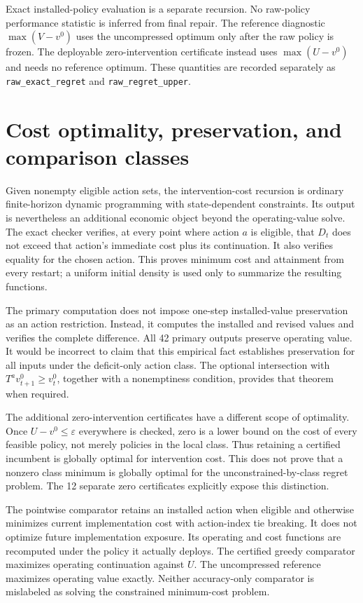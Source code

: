 Exact installed-policy evaluation is a separate recursion. No raw-policy performance statistic is inferred from final repair. The reference diagnostic $\max(V-v^0)$ uses the uncompressed optimum only after the raw policy is frozen. The deployable zero-intervention certificate instead uses $\max(U-v^0)$ and needs no reference optimum. These quantities are recorded separately as \texttt{raw\_exact\_regret} and \texttt{raw\_regret\_upper}.

\section{Cost optimality, preservation, and comparison classes}\label{app:cost}
Given nonempty eligible action sets, the intervention-cost recursion is ordinary finite-horizon dynamic programming with state-dependent constraints. Its output is nevertheless an additional economic object beyond the operating-value solve. The exact checker verifies, at every point where action $a$ is eligible, that $D_t$ does not exceed that action's immediate cost plus its continuation. It also verifies equality for the chosen action. This proves minimum cost and attainment from every restart; a uniform initial density is used only to summarize the resulting functions.

The primary computation does not impose one-step installed-value preservation as an action restriction. Instead, it computes the installed and revised values and verifies the complete difference. All 42 primary outputs preserve operating value. It would be incorrect to claim that this empirical fact establishes preservation for all inputs under the deficit-only action class. The optional intersection with $T^av^0_{t+1}\ge v^0_t$, together with a nonemptiness condition, provides that theorem when required.

The additional zero-intervention certificates have a different scope of optimality. Once $U-v^0\le\varepsilon$ everywhere is checked, zero is a lower bound on the cost of every feasible policy, not merely policies in the local class. Thus retaining a certified incumbent is globally optimal for intervention cost. This does not prove that a nonzero class minimum is globally optimal for the unconstrained-by-class regret problem. The 12 separate zero certificates explicitly expose this distinction.

The pointwise comparator retains an installed action when eligible and otherwise minimizes current implementation cost with action-index tie breaking. It does not optimize future implementation exposure. Its operating and cost functions are recomputed under the policy it actually deploys. The certified greedy comparator maximizes operating continuation against $U$. The uncompressed reference maximizes operating value exactly. Neither accuracy-only comparator is mislabeled as solving the constrained minimum-cost problem.

